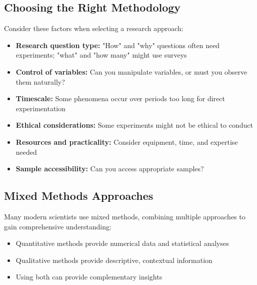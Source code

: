 \subsection{Choosing the Right Methodology}

Consider these factors when selecting a research approach:

\begin{itemize}
    \item \textbf{Research question type:} "How" and "why" questions often need experiments; "what" and "how many" might use surveys
    
    \item \textbf{Control of variables:} Can you manipulate variables, or must you observe them naturally?
    
    \item \textbf{Timescale:} Some phenomena occur over periods too long for direct experimentation
    
    \item \textbf{Ethical considerations:} Some experiments might not be ethical to conduct
    
    \item \textbf{Resources and practicality:} Consider equipment, time, and expertise needed
    
    \item \textbf{Sample accessibility:} Can you access appropriate samples?
\end{itemize}

    \centering

\subsection{Mixed Methods Approaches}

Many modern scientists use mixed methods, combining multiple approaches to gain comprehensive understanding:

\begin{itemize}
    \item Quantitative methods provide numerical data and statistical analyses
    \item Qualitative methods provide descriptive, contextual information
    \item Using both can provide complementary insights
\end{itemize}

